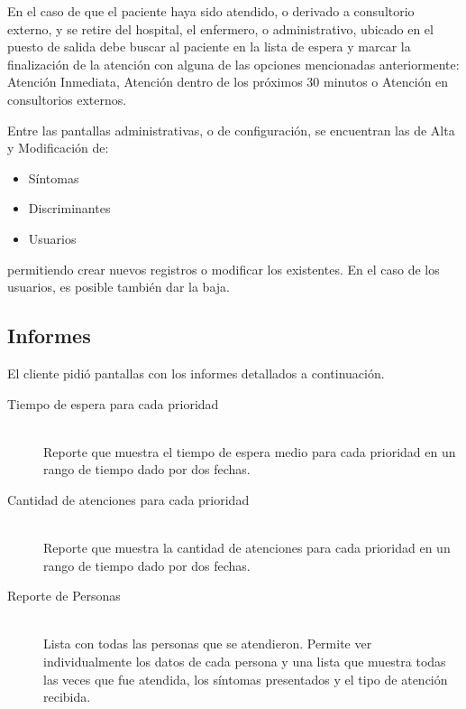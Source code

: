 En el caso de que el paciente haya sido atendido, o derivado a consultorio externo, y se retire del hospital, el enfermero, o administrativo, ubicado en el puesto de salida debe buscar al paciente en la lista de espera y marcar la finalización de la atención con alguna de las opciones mencionadas anteriormente: Atención Inmediata, Atención dentro de los próximos 30 minutos o Atención en consultorios externos.

Entre las pantallas administrativas, o de configuración, se encuentran las de Alta y Modificación de:
\begin{itemize}
\item Síntomas
\item Discriminantes
\item Usuarios
\end{itemize}
%
permitiendo crear nuevos registros o modificar los existentes. En el caso de los usuarios, es posible también dar la baja.




\subsection{Informes}
El cliente pidió pantallas con los informes detallados a continuación.

\begin{description}
\item[Tiempo de espera para cada prioridad]  \mbox{} \\
Reporte que muestra el tiempo de espera medio para cada prioridad en un rango de tiempo dado por dos fechas. 


\item[Cantidad de atenciones para cada prioridad]\mbox{} \\
Reporte que muestra la cantidad de atenciones para cada prioridad en un rango de tiempo dado por dos fechas.

\item[Reporte de Personas] \mbox{} \\
Lista con todas las personas que se atendieron. Permite ver individualmente los datos de cada persona y una lista que muestra todas las veces que fue atendida, los síntomas presentados y el tipo de atención recibida.
\end{description}
